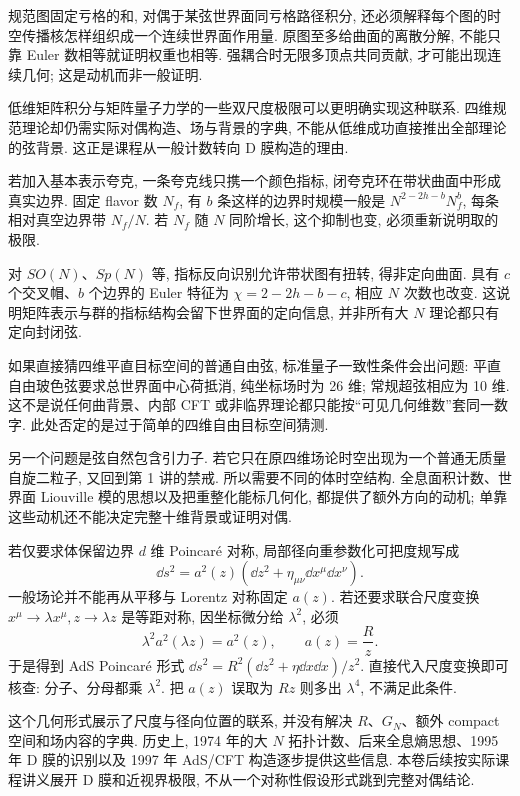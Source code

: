 规范图固定亏格的和, 对偶于某弦世界面同亏格路径积分, 还必须解释每个图的时空传播核怎样组织成一个连续世界面作用量. 原图至多给曲面的离散分解, 不能只靠 Euler 数相等就证明权重也相等. 强耦合时无限多顶点共同贡献, 才可能出现连续几何; 这是动机而非一般证明.

低维矩阵积分与矩阵量子力学的一些双尺度极限可以更明确实现这种联系. 四维规范理论却仍需实际对偶构造、场与背景的字典, 不能从低维成功直接推出全部理论的弦背景. 这正是课程从一般计数转向 D 膜构造的理由.

若加入基本表示夸克, 一条夸克线只携一个颜色指标, 闭夸克环在带状曲面中形成真实边界. 固定 flavor 数 $N_f$, 有 $b$ 条这样的边界时规模一般是 $N^{2-2h-b}N_f^b$, 每条相对真空边界带 $N_f/N$. 若 $N_f$ 随 $N$ 同阶增长, 这个抑制也变, 必须重新说明取的极限.

对 $SO(N)$、$Sp(N)$ 等, 指标反向识别允许带状图有扭转, 得非定向曲面. 具有 $c$ 个交叉帽、$b$ 个边界的 Euler 特征为 $\chi=2-2h-b-c$, 相应 $N$ 次数也改变. 这说明矩阵表示与群的指标结构会留下世界面的定向信息, 并非所有大 $N$ 理论都只有定向封闭弦.

如果直接猜四维平直目标空间的普通自由弦, 标准量子一致性条件会出问题: 平直自由玻色弦要求总世界面中心荷抵消, 纯坐标场时为 26 维; 常规超弦相应为 10 维. 这不是说任何曲背景、内部 CFT 或非临界理论都只能按“可见几何维数”套同一数字. 此处否定的是过于简单的四维自由目标空间猜测.

另一个问题是弦自然包含引力子. 若它只在原四维场论时空出现为一个普通无质量自旋二粒子, 又回到第 1 讲的禁戒. 所以需要不同的体时空结构. 全息面积计数、世界面 Liouville 模的思想以及把重整化能标几何化, 都提供了额外方向的动机; 单靠这些动机还不能决定完整十维背景或证明对偶.

若仅要求体保留边界 $d$ 维 Poincaré 对称, 局部径向重参数化可把度规写成
\[
\dd s^2=a^2(z)\left(\dd z^2+\eta_{\mu\nu}\dd x^\mu\dd x^\nu\right).
\]
一般场论并不能再从平移与 Lorentz 对称固定 $a(z)$. 若还要求联合尺度变换 $x^\mu\to\lambda x^\mu,z\to\lambda z$ 是等距对称, 因坐标微分给 $\lambda^2$, 必须
\[
\lambda^2a^2(\lambda z)=a^2(z),\qquad
a(z)=\frac Rz.
\]
于是得到 AdS Poincaré 形式 $\dd s^2=R^2(\dd z^2+\eta\dd x\dd x)/z^2$. 直接代入尺度变换即可核查: 分子、分母都乘 $\lambda^2$. 把 $a(z)$ 误取为 $Rz$ 则多出 $\lambda^4$, 不满足此条件.

这个几何形式展示了尺度与径向位置的联系, 并没有解决 $R$、$G_N$、额外 compact 空间和场内容的字典. 历史上, 1974 年的大 $N$ 拓扑计数、后来全息熵思想、1995 年 D 膜的识别以及 1997 年 AdS/CFT 构造逐步提供这些信息. 本卷后续按实际课程讲义展开 D 膜和近视界极限, 不从一个对称性假设形式跳到完整对偶结论.
